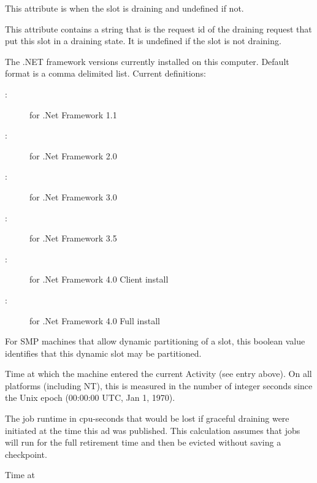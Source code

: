 \begin{description}
%
\item[\AdAttr{Draining}:] This attribute is  when the slot
is draining and undefined if not.
%
\item[\AdAttr{DrainingRequestId}:] This attribute contains a string that
is the request id of the draining request that put this slot in a draining
state.  It is undefined if the slot is not draining.
%
\item[\AdAttr{DotNetVersions}:] The .NET framework versions
currently installed on this computer. 
Default format is a comma delimited list. 
Current definitions:
  \begin{description}
  \item[:] for .Net Framework 1.1
  \item[:] for .Net Framework 2.0
  \item[:] for .Net Framework 3.0
  \item[:] for .Net Framework 3.5
  \item[:] for .Net Framework 4.0 Client install
  \item[:] for .Net Framework 4.0 Full install
  \end{description}
%
\label{DynamicSlot-machine-attribute} 
\item[\AdAttr{DynamicSlot}:] For SMP machines that allow dynamic
partitioning of a slot,
this boolean value identifies that this dynamic slot may be partitioned.
%
\item[\AdAttr{EnteredCurrentActivity}:] Time at which the machine
entered the current Activity (see  entry above).  On
all platforms (including NT), this is measured in the number of
integer seconds since the Unix epoch (00:00:00 UTC, Jan 1, 1970).
%
\item[\AdAttr{ExpectedMachineGracefulDrainingBadput}:] The
job runtime in cpu-seconds that would be lost if graceful draining
were initiated at the time this ad was published.  This calculation assumes
that jobs will run for the full retirement time and then be evicted
without saving a checkpoint.
%
\item[\AdAttr{ExpectedMachineGracefulDrainingCompletion}:] Time at

\end{description}
